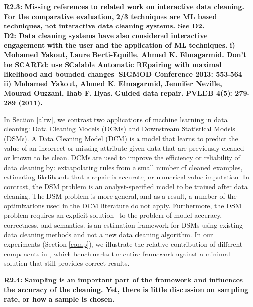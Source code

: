 \vspace{0.5em}

\noindent\textbf{R2.3: Missing references to related work on interactive data cleaning. For the comparative evaluation, 2/3 techniques are ML based techniques, not interactive data cleaning systems. See D2.\\
D2: Data cleaning systems have also considered interactive engagement with the user and the application of ML techniques. 
i) Mohamed Yakout, Laure Berti-Equille, Ahmed K. Elmagarmid. Don't be SCAREd: use SCalable Automatic REpairing with maximal likelihood and bounded changes. SIGMOD Conference 2013: 553-564
ii) Mohamed Yakout, Ahmed K. Elmagarmid, Jennifer Neville, Mourad Ouzzani, Ihab F. Ilyas.
Guided data repair. PVLDB 4(5): 279-289 (2011).
}


In Section \ref{alrw}, we contrast two applications of machine learning in data cleaning: Data Cleaning Models (DCMs) and Downstream Statistical Models (DSMs).
A Data Cleaning Model (DCM) is a model that learns to predict the value of an incorrect or missing attribute given data that are previously cleaned or known to be clean.
DCMs are used to improve the efficiency or reliability of data cleaning by: extrapolating rules from a small number of cleaned examples, estimating likelihoods that a repair is accurate, or numerical value imputation.
In contrast, the DSM problem is an analyst-specified model to be trained after data cleaning.
The DSM problem is more general, and as a result, a number of the optimizations used in the DCM literature do not apply.
Furthermore, the DSM problem requires an explicit solution~ to the problem of model accuracy, correctness, and semantics. 
\sys is an estimation framework for DSMs using existing data cleaning methods and not a new data cleaning algorithm.
In our experiments (Section \ref{comp}), we illustrate the relative contribution of different components in \sys, which benchmarks the entire framework against a minimal solution that still provides correct results.


\vspace{0.5em}

\textbf{R2.4: Sampling is an important part of the framework and influences the accuracy of the cleaning. Yet, there is little discussion on sampling rate, or how a sample is chosen.}


